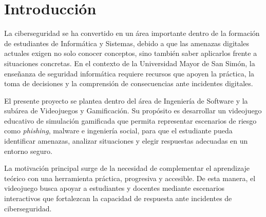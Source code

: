 \section{Introducción}

La ciberseguridad se ha convertido en un área importante dentro de la formación de estudiantes de Informática y Sistemas, debido a que las amenazas digitales actuales exigen no solo conocer conceptos, sino también saber aplicarlos frente a situaciones concretas. En el contexto de la Universidad Mayor de San Simón, la enseñanza de seguridad informática requiere recursos que apoyen la práctica, la toma de decisiones y la comprensión de consecuencias ante incidentes digitales.

El presente proyecto se plantea dentro del área de Ingeniería de Software y la subárea de Videojuegos y Gamificación. Su propósito es desarrollar un videojuego educativo de simulación gamificada que permita representar escenarios de riesgo como \textit{phishing}, malware e ingeniería social, para que el estudiante pueda identificar amenazas, analizar situaciones y elegir respuestas adecuadas en un entorno seguro.

La motivación principal surge de la necesidad de complementar el aprendizaje teórico con una herramienta práctica, progresiva y accesible. De esta manera, el videojuego busca apoyar a estudiantes y docentes mediante escenarios interactivos que fortalezcan la capacidad de respuesta ante incidentes de ciberseguridad.


